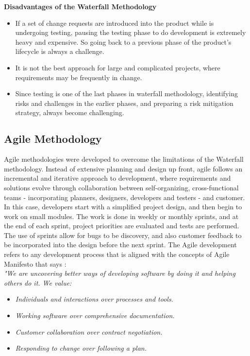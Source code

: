 \textbf{Disadvantages of the Waterfall Methodology}
\begin{itemize}
\item If a set of change requests are introduced into the product while is undergoing testing, pausing the testing phase to do development is extremely heavy and expensive. So going back to a previous phase of the product's lifecycle is always a challenge.\\

\item It is not the best approach for large and complicated projects, where requirements may be frequently in change.\\

\item Since testing is one of the last phases in waterfall methodology, identifying risks and challenges in the earlier phases, and preparing a risk mitigation strategy, always become challenging.\\

\end{itemize}

\subsection{Agile Methodology}
Agile methodologies were developed to overcome the limitations of the Waterfall methodology. Instead of extensive planning and design up front, agile follows an incremental and iterative approach to development, where requirements and solutions evolve through collaboration between self-organizing, cross-functional teams - incorporating planners, designers, developers and testers - and customer. In this case, developers start with a simplified project design, and then begin to work on small modules. The work is done in weekly or monthly sprints, and at the end of each sprint, project priorities are evaluated and tests are performed. The use of sprints allow for bugs to be discovery, and also customer feedback to be incorporated into the design before the next sprint. The Agile development refers to any development process that is aligned with the concepts of Agile Manifesto that says \cite{agile:manifesto}:\\

\textit{"We are uncovering better ways of developing software by doing it and helping others do it. We value:}

\begin{itemize}
\item \textit{Individuals and interactions over processes and tools.}
\item \textit{Working software over comprehensive documentation.}
\item \textit{Customer collaboration over contract negotiation.}
\item \textit{Responding to change over following a plan.}
\end{itemize}


